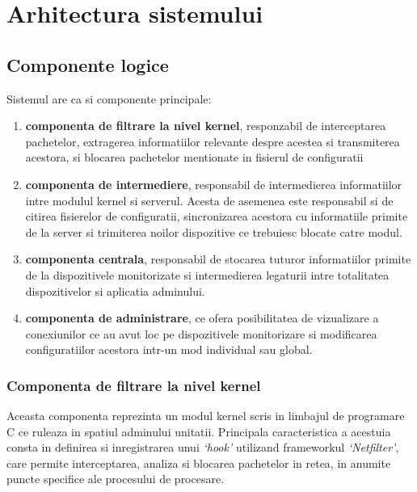 \section{Arhitectura sistemului}

\subsection{Componente logice}
\noindent
Sistemul are ca si componente principale:
{
\setlength{\parskip}{0pt}
\begin{enumerate}[noitemsep]
      \item \textbf{componenta de filtrare la nivel kernel}, responzabil de
            interceptarea pachetelor, extragerea informatiilor relevante despre acestea
            si transmiterea acestora, si blocarea pachetelor mentionate in fisierul de
            configuratii
      \item \textbf{componenta de intermediere}, responsabil de intermedierea
            informatiilor intre modulul kernel si serverul. Acesta de asemenea este
            responsabil si de citirea fisierelor de configuratii, sincronizarea acestora
            cu informatiile primite de la server si trimiterea noilor dispozitive ce
            trebuiesc blocate catre modul.
      \item \textbf{componenta centrala}, responsabil de stocarea tuturor
            informatiilor primite de la dispozitivele monitorizate si intermedierea
            legaturii intre totalitatea dispozitivelor si aplicatia adminului.
      \item \textbf{componenta de administrare}, ce ofera posibilitatea de
            vizualizare a conexiunilor ce au avut loc pe dispozitivele monitorizare si
            modificarea configuratiilor acestora intr-un mod individual sau global.
\end{enumerate}
}

\subsubsection{Componenta de filtrare la nivel kernel}
Aceasta componenta reprezinta un modul kernel scris in limbajul de programare C
ce ruleaza in spatiul adminului unitatii.  Principala caracteristica a acestuia
consta in definirea si inregistrarea unui \textit{`hook'} utilizand frameworkul
\textit{`Netfilter'}, care permite interceptarea, analiza si blocarea pachetelor
in retea, in anumite puncte specifice ale procesului de procesare.

